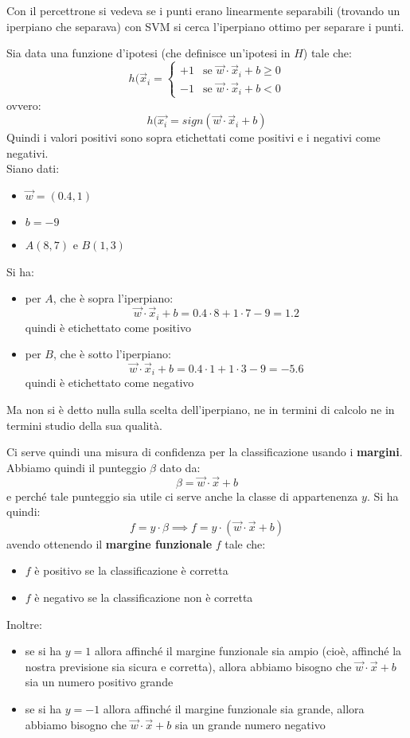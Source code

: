 Con il percettrone si vedeva se i punti erano linearmente separabili (trovando
un iperpiano che separava) con SVM si cerca l'iperpiano ottimo per separare i
punti.
\begin{esempio}
  Sia data una funzione d'ipotesi (che definisce un'ipotesi in $H$) tale che:
  \[h(\vec{x}_i=
    \begin{cases}
      +1&\mbox{se }\vec{w}\cdot\vec{x}_i+b\geq 0\\
      -1&\mbox{se }\vec{w}\cdot\vec{x}_i+b< 0
    \end{cases}
  \]
  ovvero:
  \[h(\vec{x_i}=sign(\vec{w}\cdot\vec{x}_i+b)\]
  Quindi i valori positivi sono sopra etichettati come positivi e i negativi
  come  negativi.\\
  Siano dati:
  \begin{itemize}
    \item $\vec{w}=(0.4,1)$
    \item $b=-9$
    \item $A(8,7)$ e $B(1,3)$
  \end{itemize}
  Si ha:
  \begin{itemize}
    \item per $A$, che è sopra l'iperpiano:
    \[\vec{w}\cdot\vec{x}_i+b=0.4\cdot 8+1\cdot 7-9=1.2\]
    quindi è etichettato come positivo
    \item per $B$, che è sotto l'iperpiano:
    \[\vec{w}\cdot\vec{x}_i+b=0.4\cdot 1+1\cdot 3-9=-5.6\]
    quindi è etichettato come negativo
  \end{itemize}
  Ma non si è detto nulla sulla scelta dell'iperpiano, ne in termini di calcolo
  ne in termini studio della sua qualità.
\end{esempio}
Ci serve quindi una misura di confidenza per la classificazione usando i
\textbf{margini}. \\
Abbiamo quindi il punteggio $\beta$ dato da:
\[\beta=\vec{w}\cdot\vec{x}+b\]
e perché tale punteggio sia utile ci serve anche la classe di appartenenza
$y$. Si ha quindi:
\[f=y\cdot\beta\implies f=y\cdot(\vec{w}\cdot\vec{x}+b)\]
avendo ottenendo il \textbf{margine funzionale} $f$ tale che:
\begin{itemize}
  \item $f$ è positivo se la classificazione è corretta
  \item $f$ è negativo se la classificazione non è corretta
\end{itemize}
Inoltre:
\begin{itemize}
  \item se si ha $y=1$ allora affinché il margine funzionale sia ampio (cioè,
  affinché la nostra previsione sia sicura e corretta), allora abbiamo bisogno
  che $\vec{w}\cdot\vec{x}+b$ sia un numero positivo grande 
  \item se si ha $y=-1$ allora affinché il margine funzionale sia grande, allora
  abbiamo bisogno che $\vec{w}\cdot\vec{x}+b$ sia un grande numero negativo 
\end{itemize}

